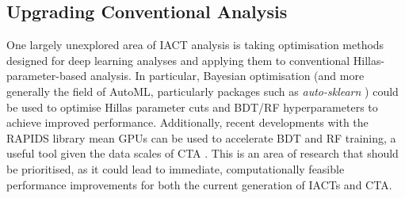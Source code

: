 \subsection{Upgrading Conventional Analysis}
One largely unexplored area of IACT analysis is taking optimisation methods designed for deep learning analyses and applying them to conventional Hillas-parameter-based analysis. In particular, Bayesian optimisation (and more generally the field of AutoML, particularly packages such as \textit{auto-sklearn} \cite{autosklearn}) could be used to optimise Hillas parameter cuts and BDT/RF hyperparameters to achieve improved performance. Additionally, recent developments with the RAPIDS \cite{rapids} library mean GPUs can be used to accelerate BDT and RF training, a useful tool given the data scales of CTA \cite{trigrate}. This is an area of research that should be prioritised, as it could lead to immediate, computationally feasible performance improvements for both the current generation of IACTs and CTA.
